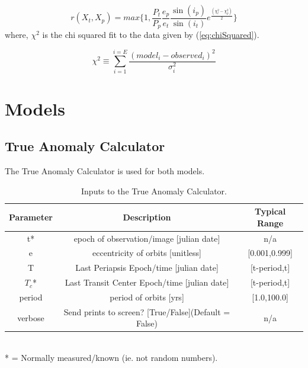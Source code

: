 \documentclass[12pt,preprint]{aastex}
\begin{document}
\begin{equation}\label{eq:metHastingsReduced}
r(X_t,X_p) = max\bigg\{1, \frac{P_t}{P_p}\frac{e_p}{e_t}\frac{\sin(i_p)}{\sin(i_t)}e^{\frac{(\chi^2_t - \chi^2_p)}{2}} \bigg\}
\end{equation}
where, $\chi^2$ is the chi squared fit to the data given by (\ref{eq:chiSquared}).

\begin{equation}\label{eq:chiSquared}
{\chi}^{2} \equiv  \sum_{i=1}^{i=E} \frac{(model_i - observed_i)^{2}}{\sigma^{2}_i}
\end{equation}




\section{Models}\label{sec:models}

\subsection{True Anomaly Calculator}\label{sec:TAcalc}
The True Anomaly Calculator is used for both models.

\begin{table}[h]
\centering
\caption{ Inputs to the True Anomaly Calculator.}
\begin{tabular}{c c c}
\hline\hline
Parameter & Description & Typical Range \\
\hline
t* & epoch of observation/image [julian date] & n/a\\
e & eccentricity of orbits [unitless] & [0.001,0.999]\\
T & Last Periapsis Epoch/time [julian date] & [t-period,t]\\
$T_c$* & Last Transit Center Epoch/time [julian date] & [t-period,t]\\
period & period of orbits [yrs] & [1.0,100.0]\\
verbose & Send prints to screen? [True/False](Default = False) & n/a\\
\hline
\end{tabular}
\\
 * = Normally measured/known (ie. not random numbers).
\end{table}
\end{document}
